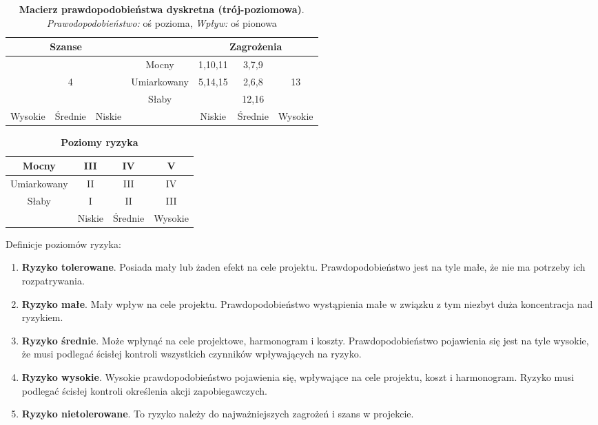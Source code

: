 \begin{table}[htb]
\centering
\begin{tabular}{|c|c|c|c|c|c|c|} 
\multicolumn{3}{|c|}{Szanse} &  & \multicolumn{3}{|c|}{Zagrożenia} \\
\hline  &  &  & Mocny & 1,10,11 & 3,7,9 &  \\
\hline  & 4 &  & Umiarkowany & 5,14,15 & 2,6,8 & 13 \\
\hline  &  &  & Słaby &  & 12,16 &  \\
\hline Wysokie & Średnie & Niskie &  & Niskie & Średnie & Wysokie \\
\end{tabular}
\caption{\textbf{Macierz prawdopodobieństwa dyskretna (trój-poziomowa)}. \mbox{\textit{Prawodopodobieństwo:}} oś pozioma,  \textit{Wpływ:} oś pionowa}
\label{tab:macierzPrawdopodobienstwa}
\end{table}


\begin{table}[htb]
\centering
\begin{tabular}{|c|c|c|c|} 
\hline Mocny & III & IV & V \\
\hline Umiarkowany & II & III & IV \\
\hline Słaby & I & II & III \\
\hline & Niskie & Średnie & Wysokie \\
\end{tabular}
\caption{\textbf{Poziomy ryzyka}}
\label{tab:poziomyRyzyka}
\end{table}


Definicje poziomów ryzyka:
\begin{enumerate}[I]
\item \textbf{Ryzyko tolerowane}. Posiada mały lub żaden efekt na cele projektu. Prawdopodobieństwo jest na tyle małe, że nie ma potrzeby ich rozpatrywania.
\item \textbf{Ryzyko małe}. Mały wpływ na cele projektu. Prawdopodobieństwo wystąpienia małe w
związku z tym niezbyt duża koncentracja nad ryzykiem.
\item \textbf{Ryzyko średnie}. Może wpłynąć na cele projektowe, harmonogram i koszty. Prawdopodobieństwo pojawienia się jest na tyle wysokie, że musi podlegać ścisłej kontroli wszystkich czynników wpływających na ryzyko.
\item \textbf{Ryzyko wysokie}. Wysokie prawdopodobieństwo pojawienia się, wpływające na cele projektu, koszt i harmonogram. Ryzyko musi podlegać ścisłej kontroli określenia akcji zapobiegawczych.
\item \textbf{Ryzyko nietolerowane}. To ryzyko należy do najważniejszych zagrożeń i szans w projekcie.
\end{enumerate}


